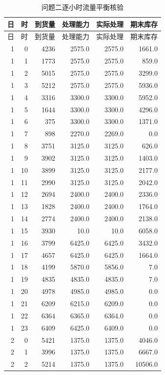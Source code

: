 \begin{longtable}{rrrrrr}
\caption{问题二逐小时流量平衡核验}\label{tab:hourly-detail}\\
\toprule 日 & 时 & 到货量 & 处理能力 & 实际处理 & 期末库存\\\midrule
\endfirsthead\toprule 日 & 时 & 到货量 & 处理能力 & 实际处理 & 期末库存\\\midrule\endhead
1 & 0 & 4236 & 2575.0 & 2575.0 & 1661.0\\
1 & 1 & 1773 & 2575.0 & 2575.0 & 859.0\\
1 & 2 & 5015 & 2575.0 & 2575.0 & 3299.0\\
1 & 3 & 5212 & 2575.0 & 2575.0 & 5936.0\\
1 & 4 & 3316 & 3300.0 & 3300.0 & 5952.0\\
1 & 5 & 1644 & 3300.0 & 3300.0 & 4296.0\\
1 & 6 & 375 & 3300.0 & 3300.0 & 1371.0\\
1 & 7 & 898 & 2270.0 & 2269.0 & 0.0\\
1 & 8 & 3751 & 3125.0 & 3125.0 & 626.0\\
1 & 9 & 3902 & 3125.0 & 3125.0 & 1403.0\\
1 & 10 & 3899 & 3125.0 & 3125.0 & 2177.0\\
1 & 11 & 2990 & 3125.0 & 3125.0 & 2042.0\\
1 & 12 & 2694 & 2400.0 & 2400.0 & 2336.0\\
1 & 13 & 1828 & 2400.0 & 2400.0 & 1764.0\\
1 & 14 & 2774 & 2400.0 & 2400.0 & 2138.0\\
1 & 15 & 3930 & 10.0 & 10.0 & 6058.0\\
1 & 16 & 3799 & 6425.0 & 6425.0 & 3432.0\\
1 & 17 & 4657 & 6425.0 & 6425.0 & 1664.0\\
1 & 18 & 4199 & 5870.0 & 5856.0 & 7.0\\
1 & 19 & 4835 & 4835.0 & 4835.0 & 7.0\\
1 & 20 & 4978 & 4985.0 & 4985.0 & 0.0\\
1 & 21 & 6209 & 6215.0 & 6209.0 & 0.0\\
1 & 22 & 6364 & 6365.0 & 6364.0 & 0.0\\
1 & 23 & 6409 & 6425.0 & 6409.0 & 0.0\\
2 & 0 & 5421 & 1375.0 & 1375.0 & 4046.0\\
2 & 1 & 3996 & 1375.0 & 1375.0 & 6667.0\\
2 & 2 & 5214 & 1375.0 & 1375.0 & 10506.0\\

\end{longtable}
